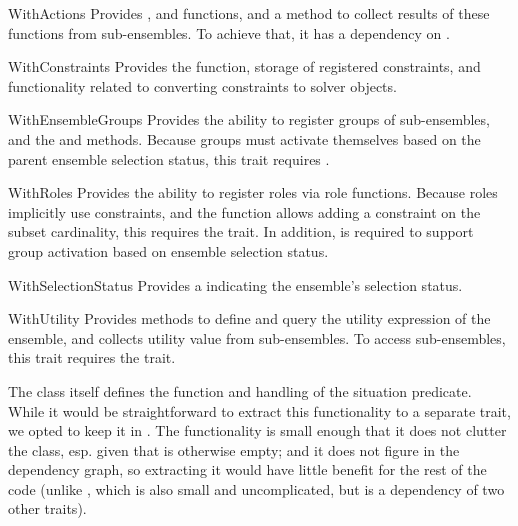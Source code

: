 \begin{trait}{WithActions}
    Provides ,  and  functions, and a method to collect
    results of these functions from sub-ensembles. To achieve that, it has a dependency
    on .
\end{trait}

\begin{trait}{WithConstraints}
    Provides the  function, storage of registered constraints, and
    functionality related to converting constraints to solver objects.
\end{trait}

\begin{trait}{WithEnsembleGroups}
    Provides the ability to register groups of sub-ensembles, and the  and
     methods. Because groups must activate themselves based on the parent
    ensemble selection status, this trait requires .
\end{trait}

\begin{trait}{WithRoles}
    Provides the ability to register roles via role functions. Because roles implicitly
    use constraints, and the  function allows adding a constraint on the
    subset cardinality, this requires the  trait. In addition,
     is required to support group activation based on ensemble
    selection status.
\end{trait}

\begin{trait}{WithSelectionStatus}
    Provides a  indicating the ensemble's selection status.
\end{trait}

\begin{trait}{WithUtility}
    Provides methods to define and query the utility expression of the ensemble, and
    collects utility value from sub-ensembles. To access sub-ensembles, this trait
    requires the  trait.
\end{trait}

\medskip

The  class itself defines the  function and handling of the
situation predicate. While it would be straightforward to extract this functionality to
a separate trait, we opted to keep it in . The functionality is small
enough that it does not clutter the class, esp. given that  is otherwise
empty; and it does not figure in the dependency graph, so extracting it would have
little benefit for the rest of the code (unlike , which is also
small and uncomplicated, but is a dependency of two other traits).

